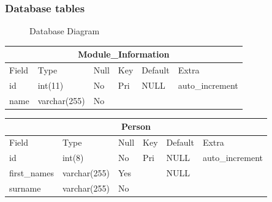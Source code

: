
\topmargin=-0.45in
\evensidemargin=0in
\oddsidemargin=0in
\textwidth=6.5in
\textheight=9.0in
\headsep=0.25in

\linespread{1.1} %
\subsubsection{Database tables}

\begin{figure}[H]
\centering	
{}
\caption{Database Diagram}
\end{figure}

\begin{table}[ht]
\centering
\begin{tabular}[c]{|l|l|l|l|l|l|}
  \hline
  \multicolumn{6}{|c|}{Module\_Information} \\
  \hline 
  Field & Type & Null & Key & Default & Extra \\ [0.5ex] %
  \hline
  id & int(11) & No & Pri & NULL & auto\_increment \\
  name & varchar(255) & No & & & \\
  \hline
\end{tabular}
\end{table} 

\begin{table}[ht]
\begin{tabular}[c]{|l|l|l|l|l|l|}
  \hline
  \multicolumn{6}{|c|}{Person} \\
  \hline 
  Field & Type & Null & Key & Default & Extra \\ [0.5ex] %
  \hline
  id & int(8) & No & Pri & NULL & auto\_increment \\
  first\_names & varchar(255) & Yes & & NULL & \\
  surname & varchar(255) & No & & & \\
  \hline
\end{tabular}
\end{table} 

